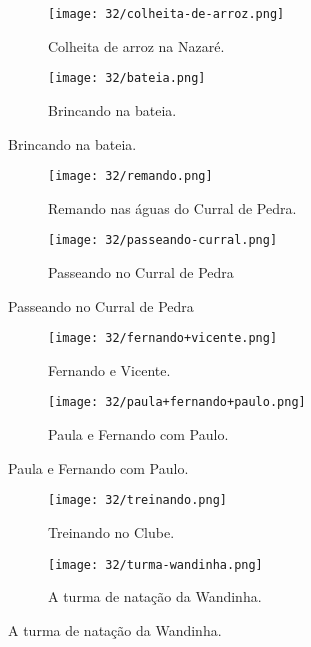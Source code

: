 \begin{figure}
\hfill
\centering
\begin{subfigure}[h]{0.48\linewidth}
\centering
\texttt{[image: 32/colheita-de-arroz.png]}
\caption{Colheita de arroz na Nazaré.}
\end{subfigure}
\hfill
\begin{subfigure}[h]{0.48\linewidth}
\centering
\texttt{[image: 32/bateia.png]}
\caption{Brincando na bateia.}
\end{subfigure}
\end{figure}

\begin{figure}\ContinuedFloat
\hfill
\centering
\begin{subfigure}[h]{0.48\linewidth}
\centering
\texttt{[image: 32/remando.png]}
\caption{Remando nas águas do Curral de Pedra.}
\end{subfigure}
\hfill
\begin{subfigure}[h]{0.48\linewidth}
\centering
\texttt{[image: 32/passeando-curral.png]}
\caption{Passeando no Curral de Pedra}
\end{subfigure}
\end{figure}

\begin{figure}\ContinuedFloat
\hfill
\centering
\begin{subfigure}[h]{0.48\linewidth}
\centering
\texttt{[image: 32/fernando+vicente.png]}
\caption{Fernando e Vicente.}
\end{subfigure}
\hfill
\begin{subfigure}[h]{0.48\linewidth}
\centering
\texttt{[image: 32/paula+fernando+paulo.png]}
\caption{Paula e Fernando com Paulo.}
\end{subfigure}
\end{figure}

\begin{figure}\ContinuedFloat
\hfill
\centering
\begin{subfigure}[h]{0.48\linewidth}
\centering
\texttt{[image: 32/treinando.png]}
\caption{Treinando no Clube.}
\end{subfigure}
\hfill
\begin{subfigure}[h]{0.48\linewidth}
\centering
\texttt{[image: 32/turma-wandinha.png]}
\caption{A turma de natação da Wandinha.}
\end{subfigure}
\end{figure}

